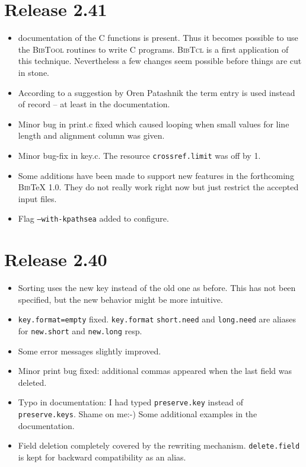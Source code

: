 \documentclass[11pt,a4paper]{scrartcl}
\newcommand\rsc[1]{\texttt{#1}}
\newcommand\File[1]{\textsf{#1}}
\newcommand\BibTool{\textsc{BibTool}}
\newcommand\BibTcl{\textsc{BibTcl}}
\newcommand\BibTeX{\textsc{Bib}\TeX}
\newenvironment{Release}[2]{%
  \def\tmp{#2}%
  \section*{Release #1 \ifx\tmp\empty\else{\normalsize[#2]}\fi}
  \begin{itemize}
}{\end{itemize}}
\newenvironment{Fix}[1]{\item }{}
\newenvironment{New}[1]{\item }{}
\newenvironment{Doc}[1]{\item }{}
\newenvironment{Update}[1]{\item }{}
\begin{document}
\begin{multicols}
\begin{Release}{2.41}{}
\begin{Doc}{gene}
    documentation of the C functions is present. Thus it becomes possible to
    use the \BibTool{} routines to write C programs. \BibTcl{} is a first
    application of this technique. Nevertheless a few changes seem possible
    before things are cut in stone.
  \end{Doc}
  \begin{Doc}{gene}
    According to a suggestion by Oren Patashnik the term entry is used instead
    of record -- at least in the documentation.
  \end{Doc}
  \begin{Fix}{gene}
    Minor bug in \File{print.c} fixed which caused looping when small values
    for line length and alignment column was given.
  \end{Fix}
  \begin{Fix}{gene}
    Minor bug-fix in \File{key.c}. The resource \rsc{crossref.limit} was
    off by 1.
  \end{Fix}
  \begin{New}{gene}
    Some additions have been made to support new features in the forthcoming
    \BibTeX{} 1.0. They do not really work right now but just restrict the
    accepted input files.
  \end{New}
  \begin{New}{gene}
    Flag \texttt{--with-kpathsea} added to configure.
  \end{New}
 \end{Release}

 \begin{Release}{2.40}{}
  \begin{New}{gene}
    Sorting uses the new key instead of the old one as before. This has not
    been specified, but the new behavior might be more intuitive.
  \end{New}
  \begin{Fix}{gene}
    \rsc{key.format=empty} fixed. \rsc{key.format} \rsc{short.need}
    and \rsc{long.need} are aliases for \rsc{new.short} and
    \rsc{new.long} resp.
  \end{Fix}
  \begin{Update}{gene}
    Some error messages slightly improved.
  \end{Update}
  \begin{Fix}{gene}
    Minor print bug fixed: additional commas appeared when the last field was
    deleted.
  \end{Fix}
  \begin{Doc}{gene}
    Typo in documentation: I had typed \rsc{preserve.key} instead of
    \rsc{preserve.keys}. Shame on me:-) Some additional examples in the
    documentation.
  \end{Doc}
  \begin{Update}{gene}
    Field deletion completely covered by the rewriting mechanism.
    \rsc{delete.field} is kept for backward compatibility as an alias.
  \end{Update}
 \end{Release}


\end{multicols}
\end{document}
